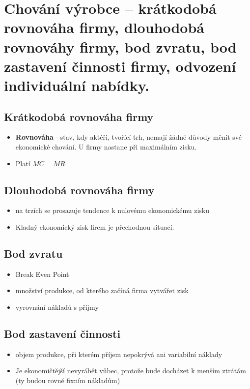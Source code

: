 \clearpage
\section{Chování výrobce – krátkodobá rovnováha firmy, dlouhodobá rovnováhy firmy, bod
zvratu, bod zastavení činnosti firmy, odvození individuální nabídky.}

\subsection{Krátkodobá rovnováha firmy}
\begin{itemize}
    \item \textbf{Rovnováha} - stav, kdy aktéři, tvořící trh, nemají žádné důvody měnit
    své ekonomické chování. U firmy nastane při maximálním zisku.
    \item Platí $MC=MR$
\end{itemize}

\subsection{Dlouhodobá rovnováha firmy}
\begin{itemize}
    \item na trzích se prosazuje tendence k nulovému ekonomickému zisku
    \item Kladný ekonomický zisk firem je přechodnou situací.
\end{itemize}

\subsection{Bod zvratu}
\begin{itemize}
    \item Break Even Point
    \item množství produkce, od kterého začíná firma vytvářet zisk
    \item vyrovnání nákladů s příjmy
\end{itemize}

\subsection{Bod zastavení činnosti}
\begin{itemize}
    \item objem produkce, při kterém příjem nepokrývá ani variabilní náklady
    \item Je ekonomičtější nevyrábět vůbec, protože bude docházet k menším ztrátám 
    (ty budou rovné fixním nákladům)
\end{itemize}

